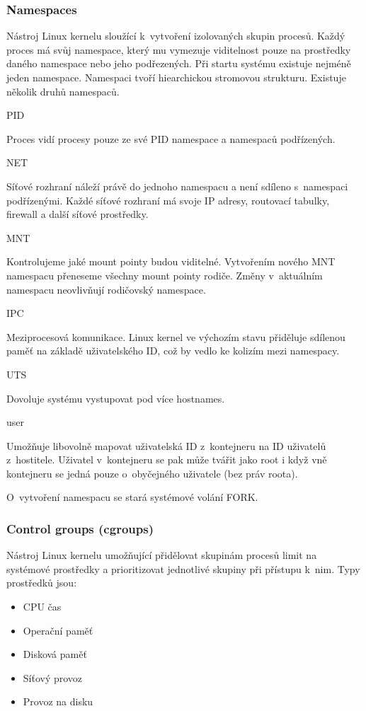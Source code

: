 \subsubsection{Namespaces}

Nástroj Linux kernelu sloužící k~vytvoření izolovaných skupin procesů.
Každý proces má svůj namespace, který mu vymezuje viditelnost pouze na prostředky daného namespace nebo jeho podřezených.
Při startu systému existuje nejméně jeden namespace.
Namespaci tvoří hiearchickou stromovou strukturu.
Existuje několik druhů namespaců.

PID

Proces vidí procesy pouze ze své PID namespace a namespaců podřízených.

NET

Síťové rozhraní náleží právě do jednoho namespacu a není sdíleno s~namespaci podřízenými.
Každé síťové rozhraní má svoje IP adresy, routovací tabulky, firewall a další síťové prostředky. 

MNT

Kontrolujeme jaké mount pointy budou viditelné.
Vytvořením nového MNT namespacu přeneseme všechny mount pointy rodiče.
Změny v~aktuálním namespacu neovlivňují rodičovský namespace. 

IPC

Meziprocesová komunikace.
Linux kernel ve výchozím stavu přiděluje sdílenou paměť na základě uživatelského ID, což by vedlo ke kolizím mezi namespacy.


UTS

Dovoluje systému vystupovat pod více hostnames.

user

Umožňuje libovolně mapovat uživatelská ID z~kontejneru na ID uživatelů z~hostitele.
Uživatel v~kontejneru se pak může tvářit jako root i když vně kontejneru se jedná pouze o~obyčejného uživatele (bez práv roota).


O~vytvoření namespacu se stará systémové volání FORK.

\subsubsection{Control groups (cgroups)}

Nástroj Linux kernelu umožňující přidělovat skupinám procesů limit na systémové prostředky a prioritizovat jednotlivé skupiny při přístupu k~nim.
Typy prostředků jsou:
\begin{itemize}
	\item CPU čas
	\item Operační paměť
	\item Disková paměť %
	\item Síťový provoz
	\item Provoz na disku
\end{itemize}

